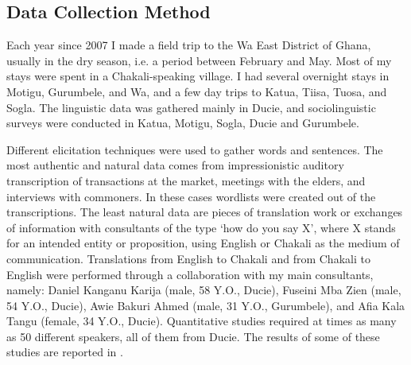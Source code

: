 \subsection{Data Collection Method}
\label{sec:lects}

Each year since 2007 I  made a field trip to the Wa East District of Ghana, 
usually in the dry season, i.e.  a  period between February and  May.  Most of 
my stays were spent in a Chakali-speaking village. I had several overnight stays 
in Motigu, Gurumbele,  and Wa, and a few day trips to Katua, Tiisa, Tuosa, and 
Sogla. The linguistic data was gathered mainly in Ducie, and sociolinguistic 
surveys were conducted in Katua, Motigu, Sogla, Ducie and Gurumbele.  



Different elicitation techniques were used to gather words and sentences.  The 
most authentic and
natural data comes from impressionistic auditory transcription of transactions 
at the market, meetings 
with the elders,  and interviews with commoners. In these cases wordlists were 
created out of the transcriptions. The least natural data are pieces of 
translation work  or exchanges of information with consultants of the type `how 
do you say X', where X stands for an intended entity or proposition, using 
English or Chakali as the medium of communication. Translations from English to 
Chakali and 
from Chakali to English  were performed through a  collaboration with 
 my main consultants, namely: 
Daniel Kanganu Karija (male, 58 Y.O., Ducie), Fuseini Mba Zien (male, 54 Y.O., 
Ducie), Awie Bakuri Ahmed (male, 31 Y.O., 
Gurumbele), and Afia Kala Tangu 
(female, 34 Y.O., Ducie). Quantitative studies required at times as many as 
50 different speakers, all of them from Ducie. The results of some of these 
studies are reported in  
\citet{BrinAtin12, brin16}.

